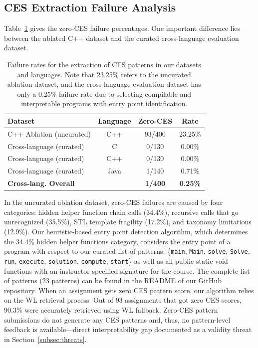 \subsection{CES Extraction Failure Analysis}
\label{subsec:error_analysis}

Table~\ref{tab:ces_failure} gives the zero-CES failure percentages. One important difference lies between the ablated C++ dataset and the curated cross-language evaluation dataset.

\begin{table}[ht]
\caption{Failure rates for the extraction of CES patterns in our datasets and languages. Note that 23.25\% refers to the uncurated ablation dataset, and the cross-language evaluation dataset has only a 0.25\% failure rate due to selecting compilable and interpretable programs with entry point identification.}
\label{tab:ces_failure}
\centering
\begin{tabular}{|l|c|c|c|}
\hline
\textbf{Dataset} & \textbf{Language} & \textbf{Zero-CES} & \textbf{Rate} \\
\hline
C++ Ablation (uncurated) & C++ & 93/400 & 23.25\% \\
\hline
Cross-language (curated) & C   & 0/130  & 0.00\% \\
Cross-language (curated) & C++ & 0/130  & 0.00\% \\
Cross-language (curated) & Java& 1/140  & 0.71\% \\
\textbf{Cross-lang. Overall} & & \textbf{1/400} & \textbf{0.25\%} \\
\hline
\end{tabular}
\end{table}

In the uncurated ablation dataset, zero-CES failures are caused by four categories: hidden helper function chain calls (34.4\%), recursive calls that go unrecognized (35.5\%), STL template fragility (17.2\%), and taxonomy limitations (12.9\%). Our heuristic-based entry point detection algorithm, which determines the 34.4\% hidden helper functions category, considers the entry point of a program with respect to our curated list of patterns: \{\texttt{main}, \texttt{Main}, \texttt{solve}, \texttt{Solve}, \texttt{run}, \texttt{execute}, \texttt{solution}, \texttt{compute}, \texttt{start}\} as well as all public static void functions with an instructor-specified signature for the course. The complete list of patterns (23 patterns) can be found in the README of our GitHub repository. When an assignment gets zero CES pattern score, our algorithm relies on the WL retrieval process. Out of 93 assignments that got zero CES scores, 90.3\% were accurately retrieved using WL fallback. Zero-CES pattern submissions do not generate any CES patterns and, thus, no pattern-level feedback is available---direct interpretability gap documented as a validity threat in Section~\ref{subsec:threats}.
